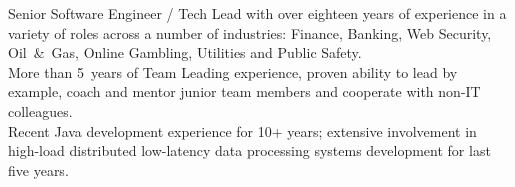 \documentclass{res}
\newcommand{\osection}[1]{\section{\sc {\Large \textbf{#1}\\}} \vspace{0.30cm}}
\newif\ifFullVersion
\begin{document}
\begin{resume}

\indent Senior Software Engineer / Tech Lead with over eighteen years of experience in a variety of roles across a number of industries: Finance, Banking, Web Security, Oil~\&~Gas, Online Gambling, Utilities and Public Safety.\\
\indent More than 5~years of Team Leading experience, proven ability to lead by example, coach and mentor junior team members and cooperate with non-IT colleagues.\\
\ifFullVersion
Strong engineering background, working knowledge and proven skills in all stages of the software development life-cycle. \\
\indent Looking for a challenging role where my skills and qualifications will add value and make a significant contribution to the company.
\else
\indent Recent Java development experience for 10+ years; extensive involvement in high-load distributed low-latency data processing systems development for last five years.
\fi


\end{resume}
\end{document}
